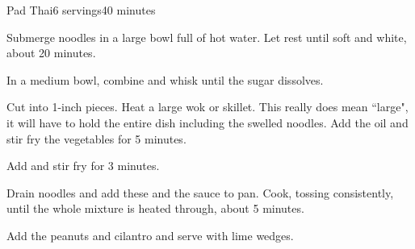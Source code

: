 \documentclass[../Cookbook.tex]{subfiles}
\begin{document}
\begin{recipe}{Pad Thai}{6 servings}{40 minutes}

Submerge noodles in a large bowl full of hot water. Let rest until soft and white, about 20 minutes.

In a medium bowl, combine and whisk until the sugar dissolves.

Cut into 1-inch pieces.
Heat a large wok or skillet. This really does mean ``large", it will have to hold the entire dish including the swelled noodles. Add the oil and stir fry the vegetables for 5 minutes.

Add and stir fry for 3 minutes.

Drain noodles and add these and the sauce to pan. Cook, tossing consistently, until the whole mixture is heated through, about 5 minutes.

Add the peanuts and cilantro and serve with lime wedges.

\end{recipe}
\end{document}
